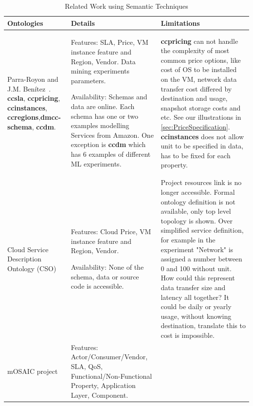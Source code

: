 \begin{longtable}[ht]{ p{.2\linewidth} p{.35\linewidth} p{.35\linewidth} }
\caption{Related Work using Semantic Techniques \label{table:OntologiesComparison}} \\
    \toprule
        Ontologies & Details & Limitations\\
    \midrule
    \endfirsthead
        Parra-Royon and J.M. Ben\'{i}tez~\cite{DataMiningServicedefinitionInCloud}.
        \textbf{ccsla}, \textbf{ccpricing}, \textbf{ccinstances}, \textbf{ccregions},\textbf{dmcc-schema}, \textbf{ccdm}.
        &
        Features:
            SLA, Price, VM instance feature and Region, Vendor. Data mining experiments parameters. 
       \bigskip
       
        Availability:
            Schemas and data are online. Each schema has one or two examples modelling Services from Amazon. One exception is \textbf{ccdm} which has 6 examples of different ML experiments.
        &
        \textbf{ccpricing} can not handle the complexity of most common price options, like cost of OS to be installed on the VM, network data transfer cost differed by destination and usage, snapshot storage costs and etc. See our illustrations in \ref{sec:PriceSpecification}. \textbf{ccinstances} does not allow unit to be specified in data, has to be fixed for each property.
        \\
        Cloud Service Description Ontology (CSO) \cite{Boukadi2016CloudSD}
        &
        Features:
            Cloud Price, VM instance feature and Region, Vendor.
        \bigskip
        
        Availability:
            None of the schema, data or source code is accessible.
        &
        Project resources link is no longer accessible.
        Formal ontology definition is not available, only top level topology is shown.
        Over simplified service definition, for example in the experiment "Network" is assigned a number between 0 and 100 without unit. How could this represent data transfer size and latency all together? It could be daily or yearly usage, without knowing destination, translate this to cost is impossible.
        \\
        mOSAIC project~\cite{Moscato2011AnAO}
        &
        Features:
            Actor/Consumer/Vendor, SLA, QoS, Functional/Non-Functional Property, Application Layer, Component.
        \bigskip
        

\end{longtable}
